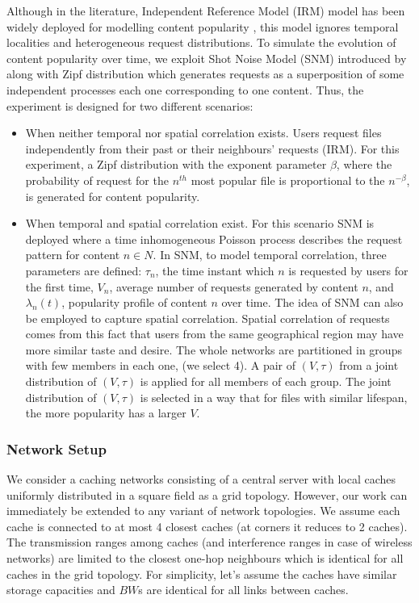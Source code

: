 \documentclass[journal,onecolumn]{IEEEtran}
\begin{document}
Although in the literature, Independent Reference Model (IRM) model has been widely deployed for modelling content popularity  \cite{coffman1973operating}, this model ignores temporal localities and heterogeneous request distributions. To simulate the evolution of content popularity over time, we exploit Shot Noise Model (SNM) introduced by \cite{traverso2013temporal} along with Zipf distribution which generates requests as a superposition of some independent processes each one corresponding to one content. Thus, the experiment is designed for two different scenarios:
\begin{itemize}

\item  When neither temporal nor spatial correlation exists. Users request files independently from their past or their neighbours' requests (IRM). For this experiment, a Zipf distribution with the exponent parameter $\beta$, where the probability of request for the $n^{th}$ most popular file is proportional to the $n^{-\beta}$, is generated for content popularity.

\item  When temporal and spatial correlation exist. For this scenario SNM is deployed where a time inhomogeneous Poisson process describes the request pattern for content $n \in N$. In SNM, to model temporal correlation, three parameters are defined: $\tau_n$, the time instant which $n$ is requested by users for the first time, $V_n$, average number of requests generated by content $n$, and $\lambda_n(t)$, popularity profile of content $n$ over time. The idea of SNM can also be employed to  capture spatial correlation. Spatial correlation of requests comes from this fact that users from the same geographical region may have more similar taste and desire. The whole networks are partitioned in groups with few members in each one, (we select 4). A pair of $(V, \tau)$ from a joint distribution of $(V,\tau)$ is applied for all members of each group. The joint distribution of $(V, \tau)$ is selected in a way that for files with similar lifespan, the more popularity has a larger $V$.  

  
\end{itemize}
  

\subsubsection{Network Setup}

We consider a caching networks consisting of a central server with local caches uniformly distributed in a square field as a grid topology. However, our work can immediately be extended to any variant of network topologies. We assume each cache is connected to at most 4 closest caches (at corners it reduces to 2 caches). The transmission ranges among caches (and interference ranges in case of wireless networks) are limited to the closest one-hop neighbours which is identical for all caches in the grid topology. For simplicity, let's assume the caches have similar storage capacities and $BW$s are identical for all links between caches.
\end{document}
